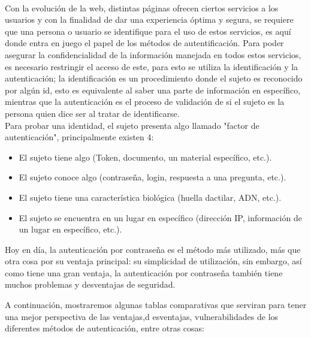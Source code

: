 \documentclass[12pt, a4paper, titlepage]{report}
\begin{document}
	    \paragraph{}Con la evolución de la web, distintas páginas ofrecen ciertos servicios a los usuarios y con la finalidad de dar una experiencia óptima y segura, se requiere que una persona o usuario se identifique para el uso de estos servicios, es aquí donde entra en juego el papel de los métodos de autentificación. Para poder asegurar la confidencialidad de la información manejada en todos estos servicios, es necesario restringir el acceso de este, para esto se utiliza la identificación y la autenticación; la identificación es un procedimiento donde el sujeto es reconocido por algún \acrshort{id}, esto es equivalente al saber una parte de información en específico, mientras que la autenticación es el proceso de validación de si el sujeto es la persona quien dice ser al tratar de identificarse.\cite{articuloAxel}\\
	    
	    Para probar una identidad, el sujeto presenta algo llamado "factor de autenticación", principalmente existen 4: 
	    \begin{itemize}
	        \item El sujeto tiene algo (Token, documento, un material específico, etc.).
	        \item El sujeto conoce algo (contraseña, login, respuesta a una pregunta, etc.).
	        \item El sujeto tiene una característica biológica (huella dactilar, ADN, etc.).
	        \item El sujeto se encuentra en un lugar en específico (dirección IP, información de un lugar en específico, etc.).
	    \end{itemize}
	    Hoy en  día, la autenticación por contraseña es el método más utilizado, más que otra cosa por su ventaja principal: su simplicidad de utilización, sin embargo, así como tiene una gran ventaja, la autenticación por contraseña también tiene muchos problemas y desventajas de seguridad.
	    
	    A continuación, mostraremos algunas tablas comparativas que serviran para tener una mejor perspectiva de las ventajas,d esventajas, vulnerabilidades de los diferentes métodos de autenticación, entre otras cosas:
		
\end{document}

